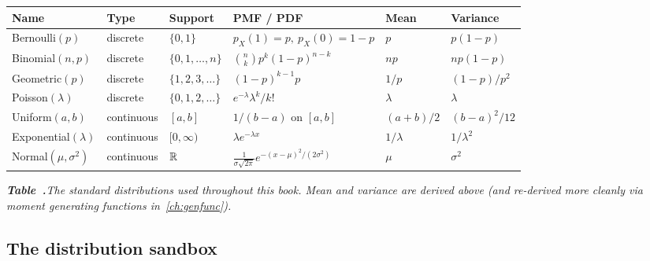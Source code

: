 \begin{fullwidth}
\centering
{\renewcommand{\arraystretch}{1.4}\footnotesize
\begin{tabular}{@{}llllll@{}}
\toprule
\textbf{Name} & \textbf{Type} & \textbf{Support} & \textbf{PMF / PDF} & \textbf{Mean} & \textbf{Variance} \\
\midrule
Bernoulli$(p)$ & discrete & $\{0, 1\}$ & $p_X(1) = p,\ p_X(0) = 1-p$ & $p$ & $p(1-p)$ \\
Binomial$(n, p)$ & discrete & $\{0, 1, \ldots, n\}$ & $\binom{n}{k} p^k (1-p)^{n-k}$ & $np$ & $np(1-p)$ \\
Geometric$(p)$ & discrete & $\{1, 2, 3, \ldots\}$ & $(1-p)^{k-1} p$ & $1/p$ & $(1-p)/p^2$ \\
Poisson$(\lambda)$ & discrete & $\{0, 1, 2, \ldots\}$ & $e^{-\lambda} \lambda^k / k!$ & $\lambda$ & $\lambda$ \\
\midrule
Uniform$(a, b)$ & continuous & $[a, b]$ & $1/(b-a)$ on $[a, b]$ & $(a+b)/2$ & $(b-a)^2 / 12$ \\
Exponential$(\lambda)$ & continuous & $[0, \infty)$ & $\lambda e^{-\lambda x}$ & $1/\lambda$ & $1/\lambda^2$ \\
Normal$(\mu, \sigma^2)$ & continuous & $\mathbb{R}$ & $\frac{1}{\sigma \sqrt{2\pi}} e^{-(x-\mu)^2 / (2\sigma^2)}$ & $\mu$ & $\sigma^2$ \\
\bottomrule
\end{tabular}}\par
\medskip
{}\label{tab:standard-distributions}%
{\centering\itshape\footnotesize
\textbf{Table~\thetable.}\quad The standard distributions used throughout this book. Mean and variance are derived above (and re-derived more cleanly via moment generating functions in~\cref{ch:genfunc}).\par}
\end{fullwidth}
\bigskip


\subsection*{The distribution sandbox}


